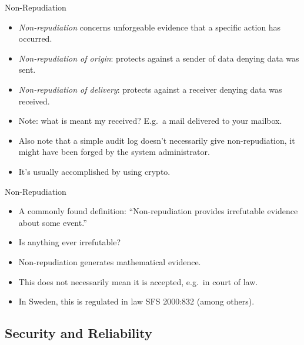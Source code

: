 \documentclass{beamer}
\begin{document}
\begin{frame}{Non-Repudiation}
  \begin{itemize}
    \item \emph{Non-repudiation} concerns unforgeable evidence that a specific 
      action has occurred.

    \item \emph{Non-repudiation of origin}: protects against a sender of data 
      denying data was sent.

    \item \emph{Non-repudiation of delivery}: protects against a receiver 
      denying data was received.

    \item Note: what is meant my received?
      E.g.~a mail delivered to your mailbox.

    \item Also note that a simple audit log doesn't necessarily give 
      non-repudiation, it might have been forged by the system administrator.

    \item It's usually accomplished by using crypto.
  \end{itemize}
\end{frame}

\begin{frame}{Non-Repudiation}
  \begin{itemize}
    \item A commonly found definition: ``Non-repudiation provides irrefutable 
      evidence about some event.''

    \item Is anything ever irrefutable?

    \item Non-repudiation generates mathematical evidence.

    \item This does not necessarily mean it is accepted, e.g.~in court of law.

    \item In Sweden, this is regulated in law SFS 2000:832 (among others).
  \end{itemize}
\end{frame}

\subsection{Security and Reliability}
\end{document}
